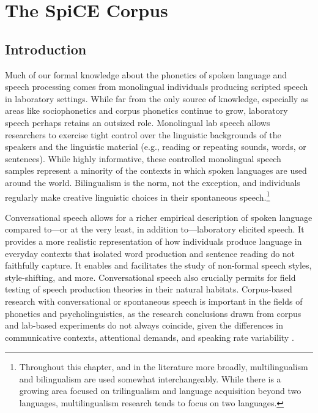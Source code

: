 \setcounter{chapter}{1}
\chapter{The SpiCE Corpus}
\label{ch2:corpus}

\section{Introduction}\label{ch2:sec:introduction}
Much of our formal knowledge about the phonetics of spoken language and speech processing comes from monolingual individuals producing scripted speech in laboratory settings. While far from the only source of knowledge, especially as areas like sociophonetics and corpus phonetics continue to grow, laboratory speech perhaps retains an outsized role. Monolingual lab speech allows researchers to exercise tight control over the linguistic backgrounds of the speakers and the linguistic material (e.g., reading or repeating sounds, words, or sentences). While highly informative, these controlled monolingual speech samples represent a minority of the contexts in which spoken languages are used around the world. Bilingualism is the norm, not the exception, and individuals regularly make creative linguistic choices in their spontaneous speech.\footnote{Throughout this chapter, and in the literature more broadly, multilingualism and bilingualism are used somewhat interchangeably. While there is a growing area focused on trilingualism and language acquisition beyond two languages, multilingualism research tends to focus on two languages.}

Conversational speech allows for a richer empirical description of spoken language compared to---or at the very least, in addition to---laboratory elicited speech. It provides a more realistic representation of how individuals produce language in everyday contexts that isolated word production and sentence reading do not faithfully capture. It enables and facilitates the study of non-formal speech styles, style-shifting, and more. Conversational speech also crucially permits for field testing of speech production theories in their natural habitats. Corpus-based research with conversational or spontaneous speech is important in the fields of phonetics and psycholinguistics, as the research conclusions drawn from corpus and lab-based experiments do not always coincide, given the differences in communicative contexts, attentional demands, and speaking rate variability \citep[e.g.,][]{gahl_2012_reduce,johnson_2021_language}. 

